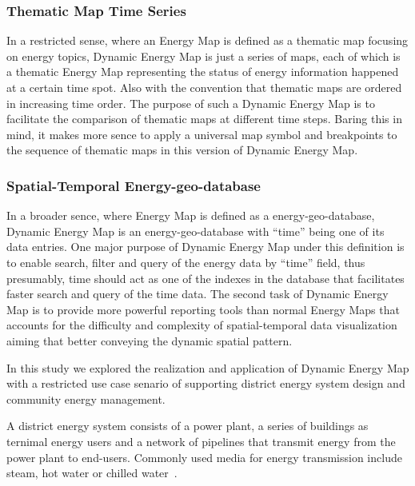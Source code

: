 \documentclass[12pt]{article}
\begin{document}
\subsubsection{Thematic Map Time Series}
In a restricted sense, where an Energy Map is defined as a thematic
map focusing on energy topics, Dynamic Energy Map is just a series of
maps, each of which is a thematic Energy Map representing the status
of energy information happened at a certain time spot. Also with the
convention that thematic maps are ordered in increasing time order.
The purpose of such a Dynamic Energy Map is to facilitate the
comparison of thematic maps at different time steps. Baring this in
mind, it makes more sence to apply a universal map symbol and
breakpoints to the sequence of thematic maps in this version of
Dynamic Energy Map.

\subsubsection{Spatial-Temporal Energy-geo-database}
In a broader sence, where Energy Map is defined as a
energy-geo-database, Dynamic Energy Map is an energy-geo-database with
``time'' being one of its data entries. One major purpose of Dynamic
Energy Map under this definition is to enable search, filter and query
of the energy data by ``time'' field, thus presumably, time should act
as one of the indexes in the database that facilitates faster search
and query of the time data.  The second task of Dynamic Energy Map is
to provide more powerful reporting tools than normal Energy Maps that
accounts for the difficulty and complexity of spatial-temporal data
visualization aiming that better conveying the dynamic spatial
pattern.

In this study we explored the realization and application of Dynamic
Energy Map with a restricted use case senario of supporting district
energy system design and community energy management. 

A district energy system consists of a power plant, a series of
buildings as ternimal energy users and a network of pipelines that
transmit energy from the power plant to end-users. Commonly used media
for energy transmission include steam, hot water or chilled water~\cite{baird2014}.
\end{document}
